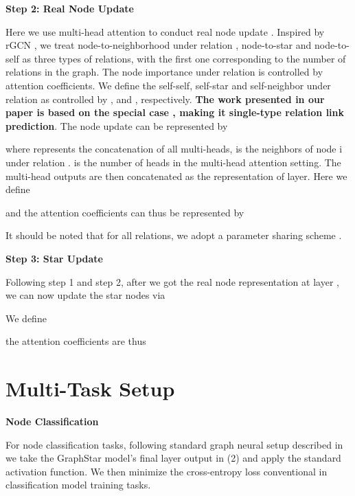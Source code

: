 \documentclass{article}
\begin{document}
\textbf{Step 2: Real Node Update}

Here we use multi-head attention to conduct real node update \cite{velivckovic2017graph}. Inspired by rGCN \cite{schlichtkrull2018modeling}, we treat node-to-neighborhood under relation , node-to-star and node-to-self as three types of relations, with the first one corresponding to the number of relations in the graph. The node importance under relation  is controlled by attention coefficients.
We define the self-self, self-star and self-neighbor under relation  as controlled by ,  and , respectively. \textbf{The work presented in our paper is based on the special case , making it single-type relation link prediction}. The node update can be represented by



where  represents the concatenation of all multi-heads,  is the neighbors of node i under relation .
 is the number of heads in the multi-head attention setting. The multi-head outputs are then concatenated as the representation of  layer. Here we define





and the attention coefficients can thus be represented by
 






It should be noted that for all relations, we adopt a parameter sharing scheme  .

\vspace{2mm}

\textbf{Step 3: Star Update}

Following step 1 and step 2, after we got the real node representation at layer , we can now update the star nodes via



We define


\vspace{1mm}

the attention coefficients are thus







\section{Multi-Task Setup}

\textbf{Node Classification}

For node classification tasks, following standard graph neural setup described in \cite{velivckovic2017graph,schlichtkrull2018modeling} we take the GraphStar model's final layer output in (2) and apply the standard  activation function. We then minimize the cross-entropy loss conventional in classification model training tasks.
\end{document}
